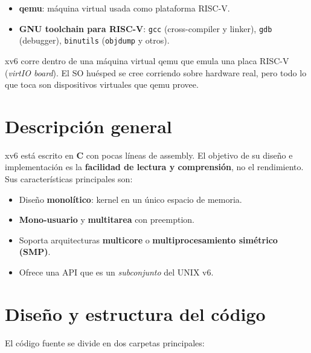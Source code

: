 \documentclass[11pt,a4paper]{article}
\begin{document}
\begin{itemize}[leftmargin=*,nosep]
    \item \textbf{qemu}: máquina virtual usada como plataforma RISC-V.
    \item \textbf{GNU toolchain para RISC-V}: \texttt{gcc}
        (cross-compiler y linker), \texttt{gdb} (debugger),
        \texttt{binutils} (\texttt{objdump} y otros).
\end{itemize}

\begin{idea}
xv6 corre dentro de una máquina virtual qemu que emula una placa
RISC-V (\emph{virtIO board}). El SO huésped se cree corriendo sobre
hardware real, pero todo lo que toca son dispositivos virtuales que
qemu provee.
\end{idea}

\section{Descripción general}

xv6 está escrito en \textbf{C} con pocas líneas de assembly. El
objetivo de su diseño e implementación es la \textbf{facilidad de
lectura y comprensión}, no el rendimiento. Sus características
principales son:

\begin{itemize}[leftmargin=*]
    \item Diseño \textbf{monolítico}: kernel en un único espacio de
        memoria.
    \item \textbf{Mono-usuario} y \textbf{multitarea} con preemption.
    \item Soporta arquitecturas \textbf{multicore} o
        \textbf{multiprocesamiento simétrico (SMP)}.
    \item Ofrece una API que es un \emph{subconjunto} del UNIX v6.
\end{itemize}

\section{Diseño y estructura del código}

El código fuente se divide en dos carpetas principales:
\end{document}
